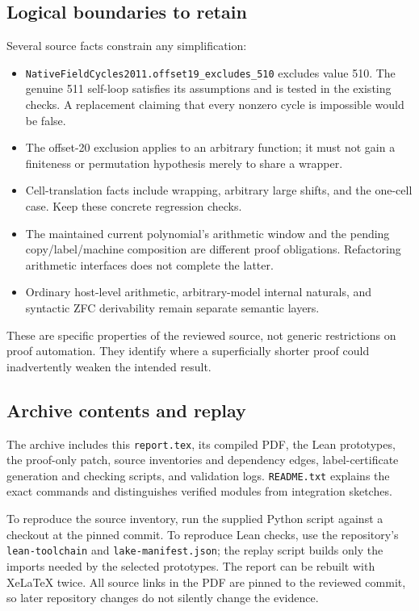 \documentclass[11pt,letterpaper]{article}
\newcommand{\code}[1]{\nolinkurl{#1}}
\begin{document}
\subsection{Logical boundaries to retain}

Several source facts constrain any simplification:
\begin{itemize}
\item \code{NativeFieldCycles2011.offset19_excludes_510} excludes value
510. The genuine 511 self-loop satisfies its assumptions and is tested
in the existing checks. A replacement claiming that every nonzero cycle
is impossible would be false.
\item The offset-20 exclusion applies to an arbitrary function; it must
not gain a finiteness or permutation hypothesis merely to share a wrapper.
\item Cell-translation facts include wrapping, arbitrary large shifts,
and the one-cell case. Keep these concrete regression checks.
\item The maintained current polynomial's arithmetic window and the
pending copy/label/machine composition are different proof obligations.
Refactoring arithmetic interfaces does not complete the latter.
\item Ordinary host-level arithmetic, arbitrary-model internal naturals,
and syntactic ZFC derivability remain separate semantic layers.
\end{itemize}

These are specific properties of the reviewed source, not generic
restrictions on proof automation. They identify where a superficially
shorter proof could inadvertently weaken the intended result.

\subsection{Archive contents and replay}

The archive includes this \code{report.tex}, its compiled PDF, the
Lean prototypes, the proof-only patch, source inventories and dependency
edges, label-certificate generation and checking scripts, and validation
logs. \code{README.txt} explains the exact commands and distinguishes
verified modules from integration sketches.

To reproduce the source inventory, run the supplied Python script against
a checkout at the pinned commit. To reproduce Lean checks, use the
repository's \code{lean-toolchain} and \code{lake-manifest.json}; the
replay script builds only the imports needed by the selected prototypes.
The report can be rebuilt with XeLaTeX twice. All source links in the
PDF are pinned to the reviewed commit, so later repository changes do
not silently change the evidence.
\end{document}
